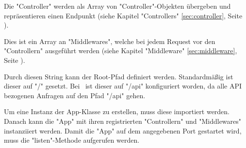 
Die "Controller" werden als Array von "Controller"-Objekten übergeben und repräsentieren einen Endpunkt (siehe Kapitel "Controllers" \ref{sec:controller}, Seite \pageref{sec:controller}).


Dies ist ein Array an "Middlewares", welche bei jedem Request vor den "Controllern" ausgeführt werden (siehe Kapitel "Middleware" \ref{sec:middleware}, Seite \pageref{sec:middleware}).


Durch diesen String kann der Root-Pfad definiert werden. Standardmäßig ist dieser auf "{\ttfamily /}" gesetzt. Bei \ZELIA\ ist dieser auf "{\ttfamily /api}" konfiguriert worden, da alle API bezogenen Anfragen auf den Pfad "{\ttfamily /api}" gehen.

\label{sec:appUsage}

Um eine Instanz der App-Klasse zu erstellen, muss diese importiert werden. Danach kann die "App" mit ihren registrierten "Controllern" und "Middlewares" instanziiert werden. Damit die "App" auf dem angegebenen Port gestartet wird, muss die "listen"-Methode aufgerufen werden.

